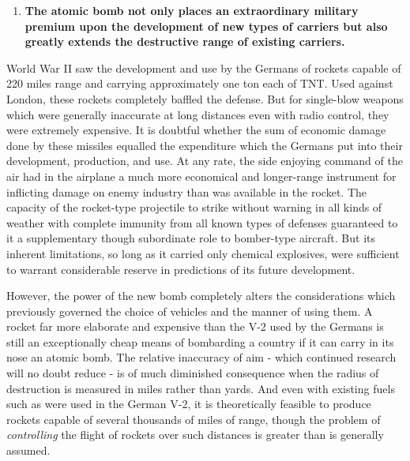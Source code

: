 \begin{enumerate}[resume*]

\item \textbf{The atomic bomb not only places an extraordinary military premium upon the development of new types of carriers but also greatly extends the destructive range of existing carriers.}

\end{enumerate}

World War II saw the development and use by the Germans of rockets capable of 220 miles range and carrying approximately one ton each of TNT. Used against London, these rockets completely baffled the defense. But for single-blow weapons which were generally inaccurate at long distances even with radio control, they were extremely expensive. It is doubtful whether the sum of economic damage done by these missiles equalled the expenditure which the Germans put into their development, production, and use. At any rate, the side enjoying command of the air had in the airplane a much more economical and longer-range instrument for inflicting damage on enemy industry than was available in the rocket. The capacity of the rocket-type projectile to strike without warning in all kinds of weather with complete immunity from all known types of defenses guaranteed to it a supplementary though subordinate role to bomber-type aircraft. But its inherent limitations, so long as it carried only chemical explosives, were sufficient to warrant considerable reserve in predictions of its future development.

\label{I-range1}

However, the power of the new bomb completely alters the considerations which previously governed the choice of vehicles and the manner of using them. A rocket far more elaborate and expensive than the V-2 used by the Germans is still an exceptionally cheap means of bombarding a country if it can carry in its nose an atomic bomb. The relative inaccuracy of aim - which continued research will no doubt reduce - is of much diminished consequence when the radius of destruction is measured in miles rather than yards. And even with existing fuels such as were used in the German V-2, it is theoretically feasible to produce rockets capable of several thousands of miles of range, though the problem of \emph{controlling} the flight of rockets over such distances is greater than is generally assumed.

